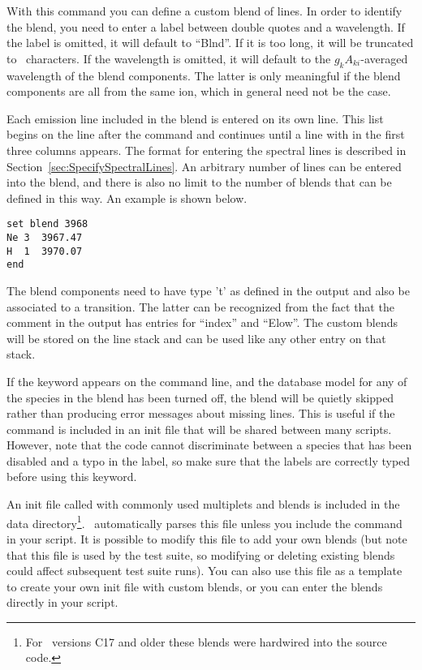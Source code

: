 With this command you can define a custom blend of lines. In order to identify
the blend, you need to enter a label between double quotes and a wavelength.
If the label is omitted, it will default to ``Blnd''. If it is too long, it
will be truncated to \LabelLenMax\ characters. If the wavelength is omitted,
it will default to the $g_k A_{ki}$-averaged wavelength of the blend
components. The latter is only meaningful if the blend components are all from
the same ion, which in general need not be the case.

Each emission line included in the blend is entered on its own line. This list
begins on the line after the  command and continues until
a line with  in the first three columns appears. The format for
entering the spectral lines is described in
Section~\ref{sec:SpecifySpectralLines}. An arbitrary number of lines can be
entered into the blend, and there is also no limit to the number of blends
that can be defined in this way. An example is shown below.
\begin{verbatim}
set blend 3968
Ne 3  3967.47
H  1  3970.07
end
\end{verbatim}

The blend components need to have type 't' as defined in the  output and also be associated to a transition. The latter can
be recognized from the fact that the comment in the  output has entries for ``index'' and ``Elow''. The custom blends
will be stored on the line stack and can be used like any other entry on that
stack.

If the keyword  appears on the  command
line, and the database model for any of the species in the blend has been
turned off, the blend will be quietly skipped rather than producing error
messages about missing lines. This is useful if the 
command is included in an init file that will be shared between many scripts.
However, note that the code cannot discriminate between a species that has
been disabled and a typo in the label, so make sure that the labels are
correctly typed before using this keyword.

An init file called  with commonly used multiplets and
blends is included in the data directory\footnote{For \Cloudy\ versions C17 and
  older these blends were hardwired into the source code.}. \Cloudy\ automatically
parses this file unless you include the  command in your
script. It is possible to modify this file to add your own blends (but note that
this file is used by the test suite, so modifying or deleting existing blends
could affect subsequent test suite runs). You can also use this file as a
template to create your own init file with custom blends, or you can enter the
blends directly in your script.

